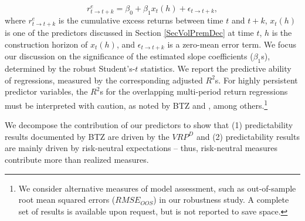 \documentclass[11pt]{article}
\begin{document}
\begin{equation}\label{EqForecastRegreession}
    r_{t\rightarrow t+k}^{e} = \beta_0+\beta_1 x_t(h) +\epsilon_{t\rightarrow t+k},
\end{equation}
where $r_{t\rightarrow t+k}^{e}$ is the cumulative excess returns between time $t$ and $t+k$, $x_t(h)$ is one of the predictors discussed in Section \ref{SecVolPremDec} at time $t$, $h$ is the construction horizon of $x_t(h)$, and $\epsilon_{t\rightarrow t+k}$ is a zero-mean error term. We focus our discussion on the significance of the estimated slope coefficients ($\beta_1$s), determined by the robust Student's-$t$ statistics. We report the predictive ability of regressions, measured by the corresponding adjusted $R^2$s. For highly persistent predictor variables, the $R^2$s for the overlapping multi-period return regressions must be interpreted with caution, as noted by BTZ and \cite{JacquierOkouJFEC13}, among others.\footnote{We consider alternative measures of model assessment, such as \cite{GoyalWelch08RFS} out-of-sample root mean squared errors ($RMSE_{OOS}$) in our robustness study. A complete set of results is available upon request, but is not reported to save space. }



We decompose the contribution of our predictors to show that (1) predictability results documented by BTZ are driven by the $VRP^D$ and (2) predictability results are mainly driven by risk-neutral expectations -- thus, risk-neutral measures contribute more than realized measures.
\end{document}
